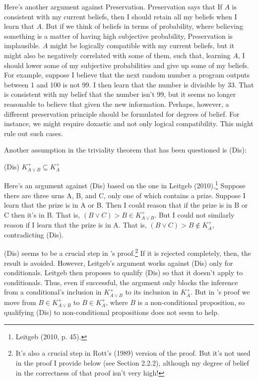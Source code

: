 \documentclass[12pt]{article}
\begin{document}
Here's another argument against Preservation. Preservation says that If $A$ is consistent with my current beliefs, then I should retain all my beliefs when I learn that $A$. But if we think of beliefs in terms of probability, where believing something is a matter of having high subjective probability, Preservation is implausible. $A$ might be logically compatible with my current beliefs, but it might also be negatively correlated with some of them, such that, learning $A$, I should lower some of my subjective probabilities and give up some of my beliefs. For example, suppose I believe that the next random number a program outputs between 1 and 100 is not 99. I then learn that the number is divisible by 33. That is consistent with my belief that the number isn't 99, but it seems no longer reasonable to believe that given the new information. Perhaps, however, a different preservation principle should be formulated for degrees of belief. For instance, we might require doxastic and not only logical compatibility. This might rule out such cases.

Another assumption in the triviality theorem that has been questioned is (Dis):

(Dis) $K_{A\lor B}^+ \subseteq K_{A}^+$

Here's an argument against (Dis) based on the one in Leitgeb (2010).\footnote{Leitgeb (2010, p. 45).} Suppose there are three urns A, B, and C, only one of which contains a prize. Suppose I learn that the prize is in A or B. Then I could reason that if the prize is in B or C then it's in B. That is, $(B \lor C) > B \in K_{A \lor B}^+$. But I could not similarly reason if I learn that the prize is in A. That is, $(B \lor C) > B \not\in K_A^+$, contradicting (Dis). 

(Dis) seems to be a crucial step in \gf's proof.\footnote{It's also a crucial step in Rott's (1989) version of the proof. But it's not used in the proof I provide below (see Section 2.2.2), although my degree of belief in the correctness of that proof isn't very high!} If it is rejected completely, then, the result is avoided. However, Leitgeb's argument works against (Dis) only for conditionals. Leitgeb then proposes to qualify (Dis) so
that it doesn't apply to conditionals. Thus, even if successful, the argument only blocks the inference from a conditional's inclusion in $K_{A\lor B}^+$ to its inclusion in $K_A^+$. But in \gf's proof we move from $B \in K_{A\lor B}^+$ to $B \in K_A^+$, where $B$ is a non-conditional proposition, so qualifying (Dis) to non-conditional propositions does not seem to help.
\end{document}
